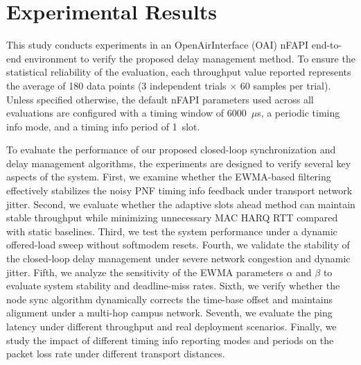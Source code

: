 \documentclass[../my_ntust_thesis.tex]{subfiles}
\begin{document}

\chapter{Experimental Results}
\label{sec:experiment}

This study conducts experiments in an OpenAirInterface (OAI) nFAPI end-to-end environment to verify the proposed delay management method. To ensure the statistical reliability of the evaluation, each throughput value reported represents the average of 180 data points (3 independent trials $\times$ 60 samples per trial). Unless specified otherwise, the default nFAPI parameters used across all evaluations are configured with a timing window of 6000~$\mu$s, a periodic timing info mode, and a timing info period of 1~slot.

To evaluate the performance of our proposed closed-loop synchronization and delay management algorithms, the experiments are designed to verify several key aspects of the system. First, we examine whether the EWMA-based filtering effectively stabilizes the noisy PNF timing info feedback under transport network jitter. Second, we evaluate whether the adaptive slots ahead method can maintain stable throughput while minimizing unnecessary MAC HARQ RTT compared with static baselines. Third, we test the system performance under a dynamic offered-load sweep without softmodem resets. Fourth, we validate the stability of the closed-loop delay management under severe network congestion and dynamic jitter. Fifth, we analyze the sensitivity of the EWMA parameters $\alpha$ and $\beta$ to evaluate system stability and deadline-miss rates. Sixth, we verify whether the node sync algorithm dynamically corrects the time-base offset and maintains alignment under a multi-hop campus network. Seventh, we evaluate the ping latency under different throughput and real deployment scenarios. Finally, we study the impact of different timing info reporting modes and periods on the packet loss rate under different transport distances.
\end{document}
